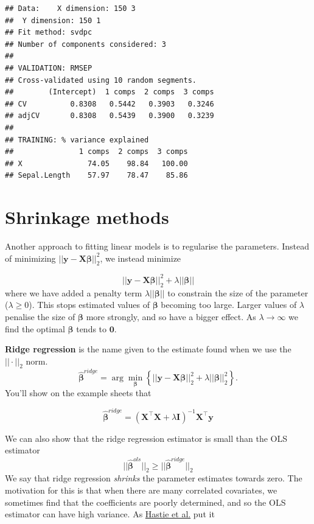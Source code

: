 \documentclass[
]{book}
\theoremstyle{definition}
\theoremstyle{definition}
\theoremstyle{definition}
\theoremstyle{definition}
\theoremstyle{remark}
\begin{document}
\begin{verbatim}
## Data:    X dimension: 150 3 
##  Y dimension: 150 1
## Fit method: svdpc
## Number of components considered: 3
## 
## VALIDATION: RMSEP
## Cross-validated using 10 random segments.
##        (Intercept)  1 comps  2 comps  3 comps
## CV          0.8308   0.5442   0.3903   0.3246
## adjCV       0.8308   0.5439   0.3900   0.3239
## 
## TRAINING: % variance explained
##               1 comps  2 comps  3 comps
## X               74.05    98.84   100.00
## Sepal.Length    57.97    78.47    85.86
\end{verbatim}

\section{Shrinkage methods}\label{shrinkage-methods}

Another approach to fitting linear models is to regularise the parameters. Instead of minimizing \(||\mathbf y- \mathbf X\boldsymbol \beta||^2_2\), we instead minimize

\[||\mathbf y- \mathbf X\boldsymbol \beta||^2_2+\lambda||\boldsymbol \beta||\]
where we have added a penalty term \(\lambda||\boldsymbol \beta||\) to constrain the size of the parameter (\(\lambda\geq 0\)). This stops estimated values of \(\boldsymbol \beta\) becoming too large.
Larger values of \(\lambda\) penalise the size of \(\boldsymbol \beta\) more strongly, and so have a bigger effect. As \(\lambda \rightarrow \infty\) we find the optimal \(\boldsymbol \beta\) tends to \({\boldsymbol 0}\).

\textbf{Ridge regression} is the name given to the estimate found when we use the \(||\cdot||_2\) norm.
\[\hat{\boldsymbol \beta}^{ridge} = \arg \min_{\boldsymbol \beta} \left\{||\mathbf y- \mathbf X\boldsymbol \beta||^2_2+\lambda||\boldsymbol \beta||_2^2 \right\}.\]
You'll show on the example sheets that

\[\hat{\boldsymbol \beta}^{ridge} = (\mathbf X^\top \mathbf X+ \lambda\mathbf I)^{-1}\mathbf X^\top \mathbf y\]

We can also show that the ridge regression estimator is small than the OLS estimator
\[||\hat{\boldsymbol \beta}^{ols}||_2 \geq ||\hat{\boldsymbol \beta}^{ridge}||_2\]
We say that ridge regression \emph{shrinks} the parameter estimates towards zero. The motivation for this is that when there are many correlated covariates, we sometimes find that the coefficients are poorly determined, and so the OLS estimator can have high variance. As \href{https://web.stanford.edu/~hastie/Papers/ESLII.pdf}{Hastie et al.} put it
\end{document}
